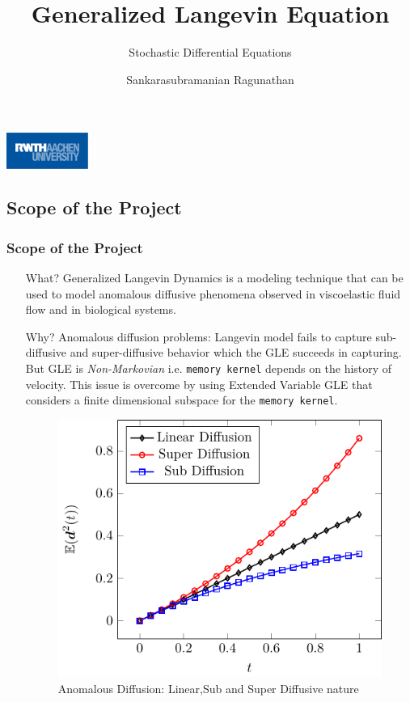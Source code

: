 \documentclass[a4paper,10pt]{beamer}
\title{Generalized Langevin Equation}
\subtitle{Stochastic Differential Equations}
\author{Sankarasubramanian Ragunathan \newline \newline 389851}
\institute{\textbf{RWTH Aachen}}
\date{}
\begin{document}
	\begin{frame}
		\titlepage
		\centering
		\includegraphics[width=0.2\textwidth]{RWTH_Aachen_University_Logo.eps}
	\end{frame}

	\begin{frame}
		\tableofcontents
	\end{frame}

	\begin{frame}
		\small
		\section{Scope of the Project}
		\frametitle{Scope of the Project}
		
		\begin{itemize}
			\item[What?]{Generalized Langevin Dynamics is a modeling technique that can be used to model anomalous diffusive phenomena observed in viscoelastic fluid flow and in biological systems.}
			
			\item[Why?]{Anomalous diffusion problems: Langevin model fails to capture sub-diffusive and super-diffusive behavior which the GLE succeeds in capturing. But GLE is \textit{Non-Markovian} i.e. \texttt{memory kernel} depends on the history of velocity. This issue is overcome by using Extended Variable GLE that considers a finite dimensional subspace for the \texttt{memory kernel}.}
			
			\begin{figure}[H]
				\centering
				\includegraphics[width=0.35\linewidth]{./Plots/Diffusion.pdf}
				\caption{Anomalous Diffusion: Linear,Sub and Super Diffusive nature}
			\end{figure}
		\end{itemize}
	\end{frame}
\end{document}

